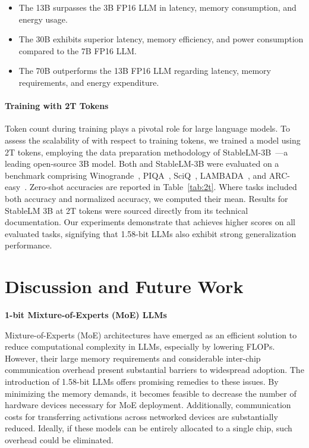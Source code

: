 \begin{itemize}
    \item The 13B  surpasses the 3B FP16 LLM in latency, memory consumption, and energy usage.
    \item The 30B  exhibits superior latency, memory efficiency, and power consumption compared to the 7B FP16 LLM.
    \item The 70B  outperforms the 13B FP16 LLM regarding latency, memory requirements, and energy expenditure.
\end{itemize}

\paragraph{Training with 2T Tokens}

Token count during training plays a pivotal role for large language models. To assess the scalability of  with respect to training tokens, we trained a  model using 2T tokens, employing the data preparation methodology of StableLM-3B~\cite{StableLM-3B-4E1T}—a leading open-source 3B model. Both  and StableLM-3B were evaluated on a benchmark comprising Winogrande~\cite{winoGrande}, PIQA~\cite{piqa}, SciQ~\cite{sciq}, LAMBADA~\cite{lambada}, and ARC-easy~\cite{arc}. Zero-shot accuracies are reported in Table~\ref{tab:2t}. Where tasks included both accuracy and normalized accuracy, we computed their mean. Results for StableLM 3B at 2T tokens were sourced directly from its technical documentation. Our experiments demonstrate that  achieves higher scores on all evaluated tasks, signifying that 1.58-bit LLMs also exhibit strong generalization performance.

\section{Discussion and Future Work}

\textbf{1-bit Mixture-of-Experts (MoE) LLMs}

Mixture-of-Experts (MoE) architectures have emerged as an efficient solution to reduce computational complexity in LLMs, especially by lowering FLOPs. However, their large memory requirements and considerable inter-chip communication overhead present substantial barriers to widespread adoption. The introduction of 1.58-bit LLMs offers promising remedies to these issues. By minimizing the memory demands, it becomes feasible to decrease the number of hardware devices necessary for MoE deployment. Additionally, communication costs for transferring activations across networked devices are substantially reduced. Ideally, if these models can be entirely allocated to a single chip, such overhead could be eliminated.

